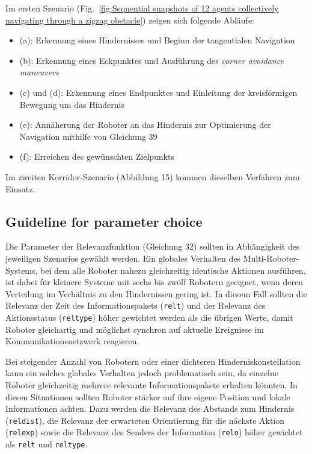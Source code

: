 \documentclass[conference]{IEEEtran}
\begin{document}
Im ersten Szenario (Fig.~\ref{fig:Sequential snapshots of 12 agents collectively navigating through a zigzag obstacle}) zeigen sich folgende Abläufe:
\begin{itemize}
\item (a): Erkennung eines Hindernisses und Beginn der tangentialen Navigation
\item (b): Erkennung eines Eckpunktes und Ausführung des \textit{corner avoidance maneuvers}
\item (c) und (d): Erkennung eines Endpunktes und Einleitung der kreisförmigen Bewegung um das Hindernis
\item (e): Annäherung der Roboter an das Hindernis zur Optimierung der Navigation mithilfe von Gleichung 39
\item (f): Erreichen des gewünschten Zielpunkts
\end{itemize}

Im zweiten Korridor-Szenario (Abbildung 15) kommen dieselben Verfahren zum Einsatz.

\subsection*{Guideline for parameter choice}
Die Parameter der Relevanzfunktion (Gleichung 32) sollten in Abhängigkeit des 
jeweiligen Szenarios gewählt werden. Ein globales Verhalten des 
Multi-Roboter-Systems, bei dem alle Roboter nahezu gleichzeitig identische 
Aktionen ausführen, ist dabei für kleinere Systeme mit sechs bis zwölf 
Robotern geeignet, wenn deren Verteilung im Verhältnis zu den Hindernissen 
gering ist. In diesem Fall sollten die Relevanz der Zeit des Informationspakets 
(\texttt{relt}) und der Relevanz des Aktionsstatus (\texttt{reltype}) höher 
gewichtet werden als die übrigen Werte, damit Roboter gleichartig und möglichst
synchron auf aktuelle Ereignisse im Kommunikationsnetzwerk reagieren.

Bei steigender Anzahl von Robotern oder einer dichteren Hinderniskonstellation 
kann ein solches globales Verhalten jedoch problematisch sein, da einzelne 
Roboter gleichzeitig mehrere relevante Informationspakete erhalten könnten. 
In diesen Situationen sollten Roboter stärker auf ihre eigene Position und lokale 
Informationen achten. Dazu werden die Relevanz des Abstands zum Hindernis 
(\texttt{reldist}), die Relevanz der erwarteten Orientierung für die nächste Aktion 
(\texttt{relexp}) sowie die Relevanz des Senders der Information (\texttt{relo}) 
höher gewichtet als \texttt{relt} und \texttt{reltype}.
\end{document}

